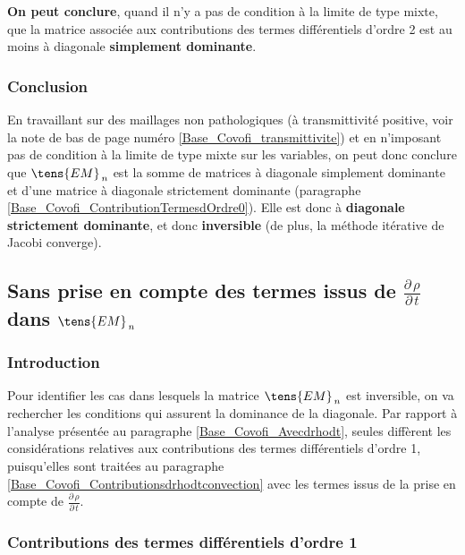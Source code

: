 {\bf On peut conclure}, quand il n'y a pas de condition à la limite de type mixte,
que la matrice associée aux contributions des termes différentiels d'ordre 2
 est au moins à diagonale {\bf simplement dominante}.



\subsubsection*{Conclusion}
En travaillant sur
des maillages non pathologiques (à transmittivité positive, voir la note de
bas de page numéro \ref{Base_Covofi_transmittivite}) et en n'imposant pas de condition à la limite
de type mixte sur les variables, on peut donc conclure que
$\tens{EM}_{\,n}$ est la somme de matrices à diagonale simplement
dominante et d'une matrice à diagonale strictement dominante (paragraphe
\ref{Base_Covofi_ContributionTermesdOrdre0}). Elle est donc  à {\bf diagonale strictement
dominante}, et donc {\bf inversible} (de plus, la
méthode itérative de Jacobi converge).


\subsection*{Sans prise en compte des termes issus de
$\displaystyle \frac {{\partial}\,\rho}{{\partial}\,t}$ dans
$\tens{EM}_{\,n}$}


\subsubsection*{Introduction}

Pour identifier les cas dans lesquels la matrice $\tens{EM}_{\,n}$ est
inversible,  on va rechercher les
conditions qui assurent la dominance de la diagonale. Par rapport à l'analyse
présentée au paragraphe \ref{Base_Covofi_Avecdrhodt}, seules diffèrent les
considérations relatives aux contributions des termes différentiels d'ordre
1, puisqu'elles sont traitées au paragraphe
\ref{Base_Covofi_Contributionsdrhodtconvection} avec les termes issus de la prise en compte
de $\displaystyle\frac {{\partial}\,\rho}{{\partial}\,t}$.

\subsubsection*{Contributions des termes différentiels d'ordre 1}

